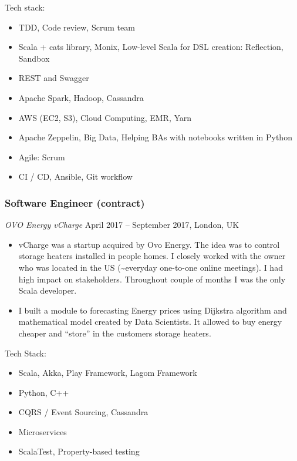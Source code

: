 \documentclass[]{rss}
\providecommand{\tightlist}{%
  \setlength{\itemsep}{0pt}\setlength{\parskip}{0pt}}
\begin{document}
\begin{resume}
Tech stack:

\begin{itemize}
\tightlist
\item
  TDD, Code review, Scrum team
\item
  Scala + cats library, Monix, Low-level Scala for DSL creation:
  Reflection, Sandbox
\item
  REST and Swagger
\item
  Apache Spark, Hadoop, Cassandra
\item
  AWS (EC2, S3), Cloud Computing, EMR, Yarn
\item
  Apache Zeppelin, Big Data, Helping BAs with notebooks written in
  Python
\item
  Agile: Scrum
\item
  CI / CD, Ansible, Git workflow
\end{itemize}

\subsubsection{Software Engineer
(contract)}\label{software-engineer-contract}

\emph{OVO Energy \textbar{} vCharge} April 2017 -- September 2017,
London, UK

\begin{itemize}
\item
  vCharge was a startup acquired by Ovo Energy. The idea was to control
  storage heaters installed in people homes. I closely worked with the
  owner who was located in the US (\textasciitilde{}everyday one-to-one
  online meetings). I had high impact on stakeholders. Throughout couple
  of months I was the only Scala developer.
\item
  I built a module to forecasting Energy prices using Dijkstra algorithm
  and mathematical model created by Data Scientists. It allowed to buy
  energy cheaper and ``store'' in the customers storage heaters.
\end{itemize}

Tech Stack:

\begin{itemize}
\tightlist
\item
  Scala, Akka, Play Framework, Lagom Framework
\item
  Python, C++
\item
  CQRS / Event Sourcing, Cassandra
\item
  Microservices
\item
  ScalaTest, Property-based testing
\end{itemize}


\end{resume}
\end{document}
